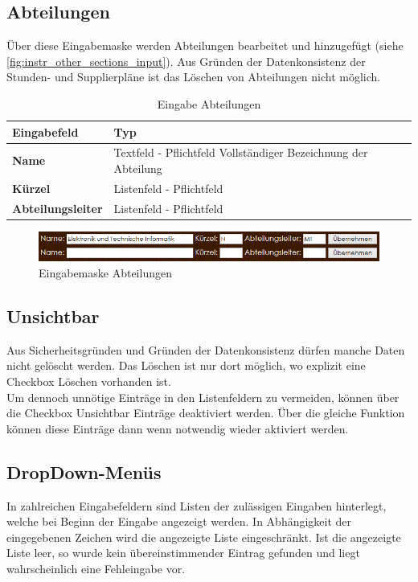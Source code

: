 \subsection{Abteilungen}
Über diese Eingabemaske werden Abteilungen bearbeitet und hinzugefügt (siehe \autoref{fig:instr_other_sections_input}). Aus Gründen der Datenkonsistenz der Stunden- und Supplierpläne ist das Löschen von Abteilungen nicht möglich.
\begin{table}[H]
\centering
\begin{tabular}{p{3 cm}p{10 cm}}
   \toprule
   \textbf{Eingabefeld} & \textbf{Typ} \\
   \midrule
          \textbf{Name} & Textfeld - Pflichtfeld \newline Vollständiger Bezeichnung der Abteilung \\
          \hline
          \textbf{Kürzel} & Listenfeld - Pflichtfeld \\
          \hline
          \textbf{Abteilungsleiter} & Listenfeld - Pflichtfeld \\
   \bottomrule
\end{tabular}
\caption{Eingabe Abteilungen}
\end{table}
\begin{figure}[H]
\centering
\includegraphics[keepaspectratio=true, width=14cm]{images/screenshots/sections_input.png}
\caption{Eingabemaske Abteilungen}
\label{fig:instr_other_sections_input}
\end{figure}
\subsection{Unsichtbar}\label{sec:instr_other_hidden}
Aus Sicherheitsgründen und Gründen der Datenkonsistenz dürfen manche Daten nicht gelöscht werden. Das Löschen ist nur dort möglich, wo explizit eine Checkbox Löschen vorhanden ist.\\
Um dennoch unnötige Einträge in den Listenfeldern zu vermeiden, können über die Checkbox Unsichtbar Einträge deaktiviert werden. Über die gleiche Funktion können diese Einträge dann wenn notwendig wieder aktiviert werden.
\subsection{DropDown-Menüs}
In zahlreichen Eingabefeldern sind Listen der zulässigen Eingaben hinterlegt, welche bei Beginn der Eingabe angezeigt werden. In Abhängigkeit der eingegebenen Zeichen wird die angezeigte Liste eingeschränkt. Ist die angezeigte Liste leer, so wurde kein übereinstimmender Eintrag gefunden und liegt wahrscheinlich eine Fehleingabe vor.